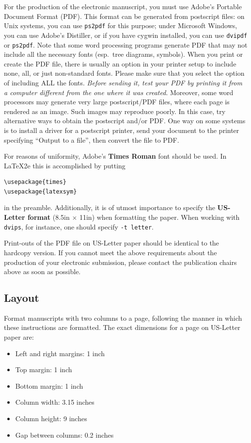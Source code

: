 \documentclass[11pt,letterpaper]{article}
\begin{document}
For the production of the electronic manuscript, you must use Adobe's
Portable Document Format (PDF). This format can be generated from
postscript files: on Unix systems, you can use {\small\tt ps2pdf} for this
purpose; under Microsoft Windows, you can use Adobe's Distiller, or
if you have cygwin installed, you can use {\small\tt dvipdf} or
{\small\tt ps2pdf}.  Note 
that some word processing programs generate PDF that may not include
all the necessary fonts (esp.\ tree diagrams, symbols). When you print
or create the PDF file, there is usually an option in your printer
setup to include none, all, or just non-standard fonts.  Please make
sure that you select the option of including ALL the fonts.  {\em
  Before sending it, test your {\/\em PDF} by printing it from a
  computer different from the one where it was created}. Moreover,
some word processors may generate very large postscript/PDF files,
where each page is rendered as an image. Such images may reproduce
poorly.  In this case, try alternative ways to obtain the postscript
and/or PDF.  One way on some systems is to install a driver for a
postscript printer, send your document to the printer specifying
``Output to a file'', then convert the file to PDF.

For reasons of uniformity, Adobe's {\bf Times Roman} font should be
used. In \LaTeX2e{} this is accomplished by putting
\small
\begin{verbatim}
\usepackage{times}
\usepackage{latexsym}
\end{verbatim}
\normalsize
in the preamble.
Additionally, it is of utmost importance to specify the {\bf
  US-Letter format} (8.5in $\times$ 11in) when formatting the paper.
When working with {\small\tt dvips}, for instance, one should specify {\small\tt -t letter}.

Print-outs of the PDF file on US-Letter paper should be identical to the
hardcopy version.  If you cannot meet the above requirements about the
production of your electronic submission, please contact the
publication chairs above  as soon as possible.

\subsection{Layout}
\label{ssec:layout}

Format manuscripts with two columns to a page, following the manner in which these
instructions are formatted. The exact dimensions for a page on US-Letter paper are:

\begin{itemize}
\item Left and right margins: 1 inch
\item Top margin: 1 inch
\item Bottom margin: 1 inch
\item Column width: 3.15 inches
\item Column height: 9 inches
\item Gap between columns: 0.2 inches
\end{itemize}
\end{document}
